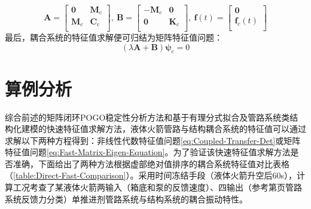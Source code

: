 \begin{displaymath}
  \boldsymbol{A}=\left[ \begin{matrix}
      \boldsymbol{0}     & \boldsymbol{M}_{c} \\
      \boldsymbol{M}_{c} & \boldsymbol{C}_{c} \\
    \end{matrix} \right],\
  \boldsymbol{B}=\left[ \begin{matrix}
      -\boldsymbol{M}_{c} & \boldsymbol{0}     \\
      \boldsymbol{0}      & \boldsymbol{K}_{c} \\
    \end{matrix} \right],\
  \boldsymbol{f}(t)=\left[ \begin{matrix}
      \boldsymbol{0}        \\
      \boldsymbol{f}_{c}(t) \\
    \end{matrix} \right]
\end{displaymath}
最后，耦合系统的特征值求解便可归结为矩阵特征值问题：
\begin{equation}
  \label{eq:Fast-Matrix-Eigen-Equation}
  \left( \lambda \boldsymbol{A}+ \boldsymbol{B} \right)\boldsymbol{\psi}_c=0
\end{equation}

\section{算例分析}
\label{sec:Lumped-Numerical-Simulation}
综合前述的矩阵闭环POGO稳定性分析方法和基于有理分式拟合及管路系统类结构化建模的快速特征值求解方法，液体火箭管路与结构耦合系统的特征值可以通过求解以下两种方程得到：非线性代数特征值问题\eqref{eq:Coupled-Transfer-Det}或矩阵特征值问题\eqref{eq:Fast-Matrix-Eigen-Equation}。为了验证该快速特征值求解方法是否准确，下面给出了两种方法根据虚部绝对值排序的耦合系统特征值对比表格（\ref{table:Direct-Fast-Comparison}）。采用时间冻结手段（液体火箭升空后60s），计算工况考查了某液体火箭两输入（箱底和泵的反馈速度）、四输出（参考第\pageref{Page:Typical-Feedback-Force}页管路系统反馈力分类）单推进剂管路系统与结构系统的耦合振动特性。

